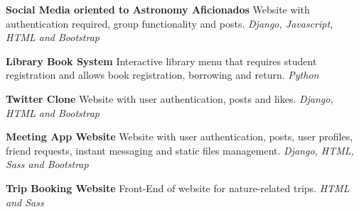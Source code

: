 \documentclass[9pt]{developercv} %
\begin{document}
\begin{description}
	\item \textbf{Social Media oriented to Astronomy Aficionados} \quad 
	Website with authentication required, group functionality and posts. \quad
	\textit{Django, Javascript, HTML and Bootstrap}
	\item \textbf{Library Book System} \quad Interactive library menu that
	requires student registration and allows book registration, borrowing and return.
	\quad \textit{Python}
	\item \textbf{Twitter Clone} \quad Website with user authentication, posts and likes.
	\quad \textit{Django, HTML and Bootstrap}
	\item \textbf{Meeting App Website} \quad Website with user authentication, posts, user
	profiles, friend requests, instant messaging and static files management.
	\quad \textit{Django, HTML, Sass and Bootstrap}
	\item \textbf{Trip Booking Website} \quad Front-End of website for nature-related trips.
	\quad \textit{HTML and Sass}
\end{description}
\end{document}
